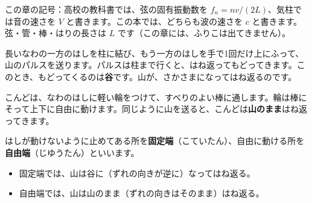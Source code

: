 \begin{omoidasou}
\end{omoidasou}

\noindent この章の記号：高校の教科書では、弦の固有振動数を $f_n=nv/(2L)$、気柱では音の速さを $V$ と書きます。この本では、どちらも波の速さを $c$ と書きます。弦・管・棒・はりの長さは $L$ です（この章には、ふりこは出てきません）。



\label{ph:波-6:sec1}
\label{ph:波-6:hansha}長いなわの一方のはしを柱に結び、もう一方のはしを手で1回だけ上にふって、山のパルスを送ります。パルスは柱まで行くと、はね返ってもどってきます。このとき、もどってくるのは\textbf{谷}です。山が、さかさまになってはね返るのです。

こんどは、なわのはしに軽い輪をつけて、すべりのよい棒に通します。輪は棒にそって上下に自由に動けます。同じように山を送ると、こんどは\textbf{山のまま}はね返ってきます。

はしが動けないように止めてある所を\textbf{固定端}（こていたん）、自由に動ける所を\textbf{自由端}（じゆうたん）といいます。
\begin{itemize}[label={\color{bkTheme}●}, leftmargin=1.6\zw, itemsep=1pt, topsep=2pt]
\item 固定端では、山は谷に（ずれの向きが逆に）なってはね返る。
\item 自由端では、山は山のまま（ずれの向きはそのまま）はね返る。
\end{itemize}

